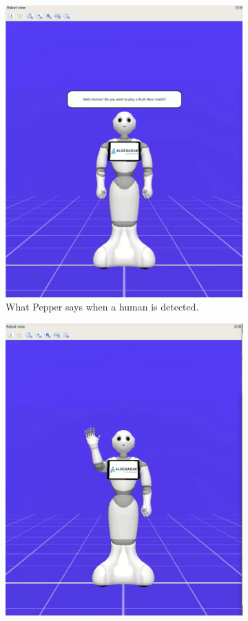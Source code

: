 \documentclass{article}
\begin{document}
\begin{figure}[H]
    \centering
    \begin{subfigure}{.5\textwidth}
      \centering
      \includegraphics[width=0.9\linewidth]{images/2_umano detectato.png}
      \caption{What Pepper says when a human is detected.}
    \end{subfigure}%
    \begin{subfigure}{.5\textwidth}
      \centering
      \includegraphics[width=0.9\linewidth]{images/3_ciao umano.png}

\end{subfigure}
\end{figure}
\end{document}
